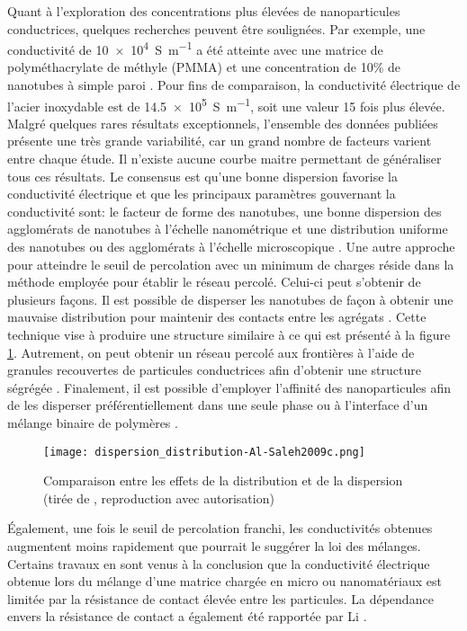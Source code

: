 \FloatBarrier
Quant à l'exploration des concentrations plus élevées de nanoparticules conductrices, quelques recherches peuvent être soulignées. 
Par exemple, une conductivité de \SI[locale=FR]{10e4}{\siemens\per\metre} a été atteinte avec une matrice de polyméthacrylate de méthyle (PMMA) et une concentration de 10\% de nanotubes à simple paroi \cite{Bauhofer2009}. 
Pour fins de comparaison, la conductivité électrique de l'acier inoxydable est de \SI[locale=FR]{14.5e5}{\siemens\per\metre}, soit une valeur 15 fois plus élevée. 
Malgré quelques rares résultats exceptionnels, l'ensemble des données publiées présente une très grande variabilité, car un grand nombre de facteurs varient entre chaque étude.
Il n'existe aucune courbe maitre permettant de généraliser tous ces résultats. 
Le consensus est qu'une bonne dispersion favorise la conductivité électrique \cite{Bauhofer2009} et que les principaux paramètres gouvernant la conductivité sont: le facteur de forme des nanotubes, une bonne dispersion des agglomérats de nanotubes à l'échelle nanométrique et une distribution uniforme des nanotubes ou des agglomérats à l'échelle microscopique \cite{Li2007a}.
Une autre approche pour atteindre le seuil de percolation avec un minimum de charges réside dans la méthode employée pour établir le réseau percolé. 
Celui-ci peut s'obtenir de plusieurs façons. 
Il est possible de disperser les nanotubes de façon à obtenir une mauvaise distribution pour maintenir des contacts entre les agrégats \cite{Al-Saleh2009c,Deng2014a}. 
Cette technique vise à produire une structure similaire à ce qui est présenté à la figure \ref{fig:dispersion_distribution}. 
Autrement, on peut obtenir un réseau percolé aux frontières à l'aide de granules recouvertes de particules conductrices afin d'obtenir une structure ségrégée \cite{Al-Saleh2011,Pang2014c}. 
Finalement, il est possible d'employer l'affinité des nanoparticules afin de les disperser préférentiellement dans une seule phase ou à l'interface d'un mélange binaire de polymères \cite{Pang2014c,Deng2014a}. 

\begin{figure}[h]
	\centering
	\texttt{[image: dispersion\_distribution-Al-Saleh2009c.png]}
	\caption{Comparaison entre les effets de la distribution et de la dispersion (tirée de \cite{Al-Saleh2009c}, reproduction avec autorisation)}
	\label{fig:dispersion_distribution}
\end{figure}

Également, une fois le seuil de percolation franchi, les conductivités obtenues augmentent moins rapidement que pourrait le suggérer la loi des mélanges. 
Certains travaux \cite{Untereker2009,Cauchy2018} en sont venus à la conclusion que la conductivité électrique obtenue lors du mélange d'une matrice chargée en micro ou nanomatériaux est limitée par la résistance de contact élevée entre les particules. 
La dépendance envers la résistance de contact a également été rapportée par Li \cite{Li2007a}. 

